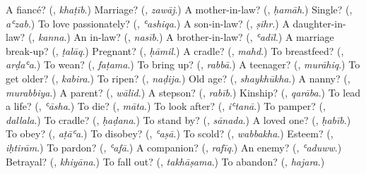 \begin{tcolorbox}[breakable,colback=teal!4,colframe=teal!35!black,title={Before you move on}]
A fiancé? (\textbf{}, \emph{khaṭīb}.) Marriage? (\textbf{}, \emph{zawāj}.) A mother-in-law? (\textbf{}, \emph{ḥamāh}.) Single? (\textbf{}, \emph{aʿzab}.) To love passionately? (\textbf{}, \emph{ʿashiqa}.) A son-in-law? (\textbf{}, \emph{ṣihr}.) A daughter-in-law? (\textbf{}, \emph{kanna}.) An in-law? (\textbf{}, \emph{nasīb}.) A brother-in-law? (\textbf{}, \emph{ʿadīl}.) A marriage break-up? (\textbf{}, \emph{ṭalāq}.) Pregnant? (\textbf{}, \emph{ḥāmil}.) A cradle? (\textbf{}, \emph{mahd}.) To breastfeed? (\textbf{}, \emph{arḍaʿa}.) To wean? (\textbf{}, \emph{faṭama}.) To bring up? (\textbf{}, \emph{rabbā}.) A teenager? (\textbf{}, \emph{murāhiq}.) To get older? (\textbf{}, \emph{kabira}.) To ripen? (\textbf{}, \emph{naḍija}.) Old age? (\textbf{}, \emph{shaykhūkha}.) A nanny? (\textbf{}, \emph{murabbiya}.) A parent? (\textbf{}, \emph{wālid}.) A stepson? (\textbf{}, \emph{rabīb}.) Kinship? (\textbf{}, \emph{qarāba}.) To lead a life? (\textbf{}, \emph{ʿāsha}.) To die? (\textbf{}, \emph{māta}.) To look after? (\textbf{}, \emph{iʿtanā}.) To pamper? (\textbf{}, \emph{dallala}.) To cradle? (\textbf{}, \emph{ḥaḍana}.) To stand by? (\textbf{}, \emph{sānada}.) A loved one? (\textbf{}, \emph{ḥabīb}.) To obey? (\textbf{}, \emph{aṭāʿa}.) To disobey? (\textbf{}, \emph{ʿaṣā}.) To scold? (\textbf{}, \emph{wabbakha}.) Esteem? (\textbf{}, \emph{iḥtirām}.) To pardon? (\textbf{}, \emph{ʿafā}.) A companion? (\textbf{}, \emph{rafīq}.) An enemy? (\textbf{}, \emph{ʿaduww}.) Betrayal? (\textbf{}, \emph{khiyāna}.) To fall out? (\textbf{}, \emph{takhāṣama}.) To abandon? (\textbf{}, \emph{hajara}.)
\end{tcolorbox}
